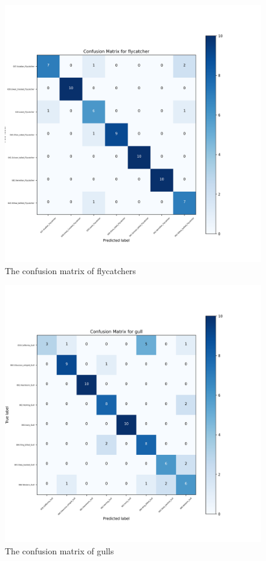 \documentclass[twocolumn]{extarticle}
\begin{document}
\begin{figure}[H]
\centering
\includegraphics[width=0.95\linewidth]{figure/eval_high_temp_flycatcher}
\caption{The confusion matrix of flycatchers}
\label{fig:evalhightempflycatcher}
\end{figure}
\begin{figure}[H]
\centering
\includegraphics[width=0.95\linewidth]{figure/eval_high_temp_gull}
\caption{The confusion matrix of gulls}
\label{fig:evalhightempgull}
\end{figure}
\end{document}
